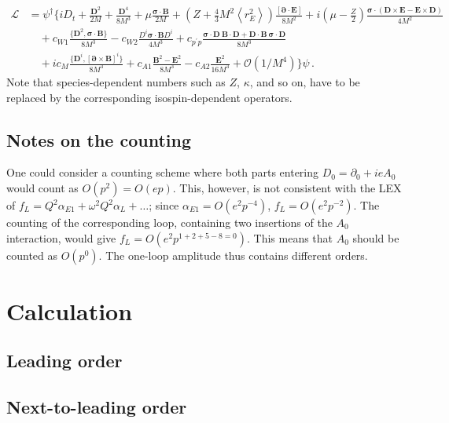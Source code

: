 \documentclass[prl,
twocolumn,
showpacs,preprintnumbers,amsmath,amssymb,
superscriptaddress,
a4paper,nofootinbib,longbibliography]{revtex4-2}
\def\nn{\nonumber}
\begin{document}
\begin{align}
\mathcal{L} &= \psi^\dagger
  \bigg\{  i D_t  + \frac{\bm{D}^2 }{ 2M}  +  \frac{\bm{D}^4 }{ 8 M^3} +
  \mu \frac{ \bm{\sigma}\cdot \bm{B} }{ 2M}   
+ \left(Z + \frac{4}{3}M^2 \left\langle r_E^2\right\rangle\right)\frac{ [\bm{\partial}\cdot \bm{E}] }{ 8 M^2}  
+ i \left(\mu-\frac{Z}{2}\right) \frac{ \bm{\sigma} \cdot ( \bm{D} \times \bm{E} - \bm{E}\times \bm{D} ) }{ 4 M^2} 
\nn\\
&\quad
+ c_{W1} \frac{  \{ \bm{D}^2 ,  \bm{\sigma}\cdot \bm{B} \}  }{ 8 M^3}  
- c_{W2} \frac{  D^i \bm{\sigma}\cdot
    \bm{B} D^i }{ 4 M^3 }  + c_{p^\prime p}  \frac{ \bm{\sigma} \cdot
    \bm{D}\ \bm{B}\cdot \bm{D} + \bm{D}\cdot\bm{B}\ \bm{\sigma}\cdot \bm{D}
    }{  8 M^3} 
\nn\\
&\quad 
+ i c_M  \frac{ \{ \bm{D}^i ,  [\bm{\partial} \times \bm{B}]^i \} }{ 8 M^3}
+ c_{A1} \frac{ \bm{B}^2 - \bm{E}^2 }{ 8 M^3}  - c_{A2} \frac{ \bm{E}^2 }{ 16 M^3 } 
+ \mathcal{O}(1/M^4)
 \bigg\} \psi  \,.
 \label{eq:abelian3c}
 \end{align}
 Note that species-dependent numbers such as $Z$, $\kappa$, and so on, have to be replaced by
 the corresponding isospin-dependent operators.
\subsection{Notes on the counting}
One could consider a counting scheme where both parts entering $D_0=\partial_0+i e A_0$ would
count as $O(p^2)=O(ep)$.
This, however, is not consistent with the LEX of $f_L=Q^2\alpha_{E1} + \omega^2 Q^2\alpha_L + \dots$;
since $\alpha_{E1}=O(e^2p^{-4})$, $f_L=O(e^2p^{-2})$. The counting of the corresponding loop,
containing two insertions of the $A_0$ interaction, would give $f_L=O(e^2p^{1+2+5-8=0})$.
This means that $A_0$ should be counted as $O(p^0)$. The one-loop amplitude thus contains different
orders.


\section{Calculation}

\subsection{Leading order}

\subsection{Next-to-leading order}
\end{document}
